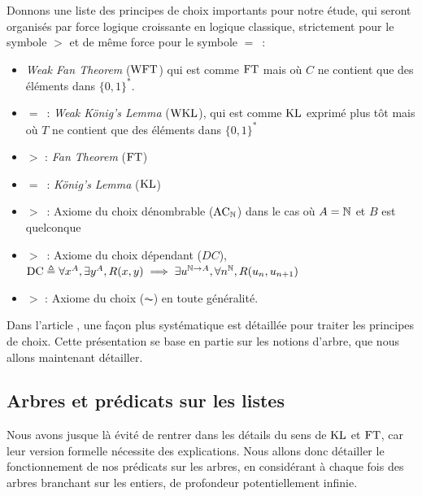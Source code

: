 \documentclass{article}
\begin{document}
Donnons une liste des principes de choix importants pour notre étude, qui seront organisés par force logique croissante en logique classique, strictement pour le symbole $>$ et de même force pour le symbole $=$~:
\begin{itemize}
    \item \textit{Weak Fan Theorem} ($\mathrm{WFT}$) qui est comme $\mathrm{FT}$ mais où $C$ ne contient que des éléments dans $\{0,1\}^*$.
    \item $=$~: \textit{Weak König's Lemma} ($\mathrm{WKL}$), qui est comme $\mathrm{KL}$ exprimé plus tôt mais où $T$ ne contient que des éléments dans $\{0,1\}^*$
    \item $>$ : \textit{Fan Theorem} ($\mathrm{FT}$)
    \item $=$~: \textit{König's Lemma} ($\mathrm{KL}$)
    \item $>$~: Axiome du choix dénombrable ($\mathrm{AC}_{\mathbb{N}}$) dans le cas où $A = \mathbb{N}$ et $B$ est quelconque
    \item $>$~: Axiome du choix dépendant ($DC$), $\mathrm{DC} \triangleq \forall x^A, \exists y^A, R(x,y) \implies \exists u^{\mathbb{N}\to A}, \forall n^{\mathbb{N}}, R(u_n,u_{n+1})$
    \item $>$ : Axiome du choix ($\AC$) en toute généralité.
\end{itemize}

Dans l'article \cite{DBLP:journals/corr/abs-2105-08951}, une façon plus systématique est détaillée pour traiter les principes de choix. Cette présentation se base en partie sur les notions d'arbre, que nous allons maintenant détailler.

\subsection{Arbres et prédicats sur les listes}

Nous avons jusque là évité de rentrer dans les détails du sens de $\mathrm{KL}$ et $\mathrm{FT}$, car leur version formelle nécessite des explications. Nous allons donc détailler le fonctionnement de nos prédicats sur les arbres, en considérant à chaque fois des arbres branchant sur les entiers, de profondeur potentiellement infinie.
\end{document}
